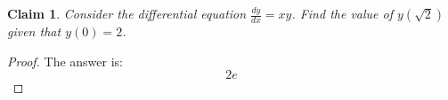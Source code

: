 \documentclass{article}
\newtheorem{theorem}{Claim}
\begin{document}
\begin{theorem}
Consider the differential equation $\frac{dy}{dx} = xy$. Find the value of $y(\sqrt{2})$ given that $y(0) = 2$.
\end{theorem}

\begin{proof}
The answer is:
\[
2e
\]
\end{proof}
\end{document}
